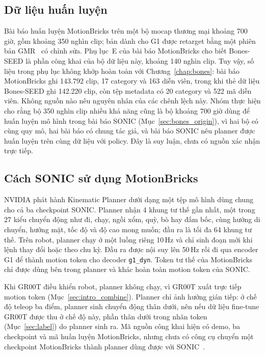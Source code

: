 \documentclass[12pt,a4paper,oneside]{report}
\newcommand{\code}[1]{\texttt{#1}}
\begin{document}
\subsection{Dữ liệu huấn luyện}
\label{sec:mb_data}

Bài báo huấn luyện MotionBricks trên một bộ mocap thương mại khoảng 700 giờ, gồm khoảng 350 nghìn clip; bản dành cho G1 được retarget bằng một phiên bản GMR~\cite{gmr} có chỉnh sửa. Phụ lục~E của bài báo MotionBricks cho biết Bones-SEED là phần công khai của bộ dữ liệu này, khoảng 140 nghìn clip. Tuy vậy, số liệu trong phụ lục không khớp hoàn toàn với Chương~\ref{chap:bones}: bài báo MotionBricks ghi 143.792 clip, 17 category và 163 diễn viên, trong khi thẻ dữ liệu Bones-SEED ghi 142.220 clip, còn tệp metadata có 20 category và 522 mã diễn viên. Không nguồn nào nêu nguyên nhân của các chênh lệch này. Nhóm thực hiện cho rằng bộ 350 nghìn clip nhiều khả năng cũng là bộ khoảng 700 giờ dùng để huấn luyện mô hình trong bài báo SONIC (Mục~\ref{sec:bones_origin}), vì hai bộ có cùng quy mô, hai bài báo có chung tác giả, và bài báo SONIC nêu planner được huấn luyện trên cùng dữ liệu với policy. Đây là suy luận, chưa có nguồn xác nhận trực tiếp.

\subsection{Cách SONIC sử dụng MotionBricks}
\label{sec:mb_sonic}

NVIDIA phát hành Kinematic Planner dưới dạng một tệp mô hình dùng chung cho cả ba checkpoint SONIC. Planner nhận 4 khung tư thế gần nhất, một trong 27 kiểu chuyển động như đi, chạy, ngồi xổm, quỳ, bò hay đấm bốc, cùng hướng di chuyển, hướng mặt, tốc độ và độ cao mong muốn; đầu ra là tối đa 64 khung tư thế. Trên robot, planner chạy ở một luồng riêng 10\,Hz và chỉ sinh đoạn mới khi lệnh thay đổi hoặc theo chu kỳ. Đầu ra được nội suy lên 50\,Hz rồi đi qua encoder G1 để thành motion token cho decoder \code{g1\_dyn}. Token tư thế của MotionBricks chỉ được dùng bên trong planner và khác hoàn toàn motion token của SONIC.

Khi GR00T điều khiển robot, planner không chạy, vì GR00T xuất trực tiếp motion token (Mục~\ref{sec:intro_combine}). Planner chỉ ảnh hưởng gián tiếp: ở chế độ teleop ba điểm, planner sinh chuyển động thân dưới, nên nếu dữ liệu fine-tune GR00T được thu ở chế độ này, phần thân dưới trong nhãn token (Mục~\ref{sec:label}) do planner sinh ra. Mã nguồn công khai hiện có demo, ba checkpoint và mã huấn luyện MotionBricks, nhưng chưa có công cụ chuyển một checkpoint MotionBricks thành planner dùng được với SONIC~\cite{issue207}.
\end{document}
